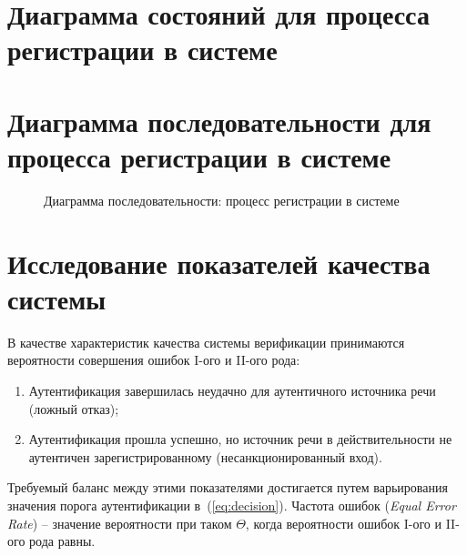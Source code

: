 \documentclass[12pt]{article}
\newcommand{\important}[1]{\emph{#1}}
\begin{document}
\begin{figure}[h!]
\end{figure}

\section{Диаграмма состояний для процесса регистрации в системе}

\begin{figure}[h!]
\end{figure}

\section{Диаграмма последовательности для процесса регистрации в системе}
\begin{figure}[hp!]
    \center{
        \fontsize{12}{14}\selectfont
        
    }
    \caption{Диаграмма последовательности: процесс регистрации в системе}
    \label{fig:seq_enrollment}
\end{figure}

\section{Исследование показателей качества системы}

В качестве характеристик качества системы верификации принимаются вероятности совершения ошибок I-ого и II-ого рода:
\begin{enumerate}
\item Аутентификация завершилась неудачно для аутентичного источника речи (ложный отказ);
\item Аутентификация прошла успешно, но источник речи в действительности не аутентичен зарегистрированному (несанкционированный вход).
\end{enumerate}

Требуемый баланс между этими показателями достигается путем варьирования значения порога аутентификации в~(\ref{eq:decision}).
Частота ошибок (\important{Equal Error Rate}) -- значение вероятности при таком $\Theta$, когда вероятности ошибок I-ого и II-ого рода равны.
\end{document}
